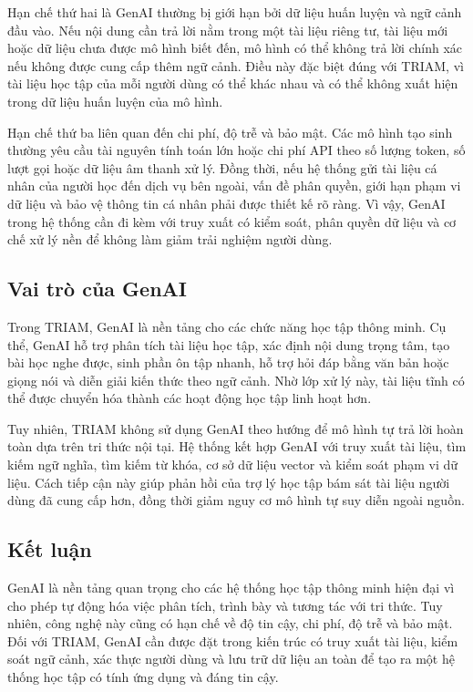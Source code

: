 \documentclass[12pt,a4paper]{report}
\begin{document}
Hạn chế thứ hai là GenAI thường bị giới hạn bởi dữ liệu huấn luyện và ngữ cảnh đầu vào. Nếu nội dung cần trả lời nằm trong một tài liệu riêng tư, tài liệu mới hoặc dữ liệu chưa được mô hình biết đến, mô hình có thể không trả lời chính xác nếu không được cung cấp thêm ngữ cảnh. Điều này đặc biệt đúng với TRIAM, vì tài liệu học tập của mỗi người dùng có thể khác nhau và có thể không xuất hiện trong dữ liệu huấn luyện của mô hình.

Hạn chế thứ ba liên quan đến chi phí, độ trễ và bảo mật. Các mô hình tạo sinh thường yêu cầu tài nguyên tính toán lớn hoặc chi phí API theo số lượng token, số lượt gọi hoặc dữ liệu âm thanh xử lý. Đồng thời, nếu hệ thống gửi tài liệu cá nhân của người học đến dịch vụ bên ngoài, vấn đề phân quyền, giới hạn phạm vi dữ liệu và bảo vệ thông tin cá nhân phải được thiết kế rõ ràng. Vì vậy, GenAI trong hệ thống cần đi kèm với truy xuất có kiểm soát, phân quyền dữ liệu và cơ chế xử lý nền để không làm giảm trải nghiệm người dùng.

\subsection{Vai trò của GenAI}

Trong TRIAM, GenAI là nền tảng cho các chức năng học tập thông minh. Cụ thể, GenAI hỗ trợ phân tích tài liệu học tập, xác định nội dung trọng tâm, tạo bài học nghe được, sinh phần ôn tập nhanh, hỗ trợ hỏi đáp bằng văn bản hoặc giọng nói và diễn giải kiến thức theo ngữ cảnh. Nhờ lớp xử lý này, tài liệu tĩnh có thể được chuyển hóa thành các hoạt động học tập linh hoạt hơn.

Tuy nhiên, TRIAM không sử dụng GenAI theo hướng để mô hình tự trả lời hoàn toàn dựa trên tri thức nội tại. Hệ thống kết hợp GenAI với truy xuất tài liệu, tìm kiếm ngữ nghĩa, tìm kiếm từ khóa, cơ sở dữ liệu vector và kiểm soát phạm vi dữ liệu. Cách tiếp cận này giúp phản hồi của trợ lý học tập bám sát tài liệu người dùng đã cung cấp hơn, đồng thời giảm nguy cơ mô hình tự suy diễn ngoài nguồn.

\subsection{Kết luận}

GenAI là nền tảng quan trọng cho các hệ thống học tập thông minh hiện đại vì cho phép tự động hóa việc phân tích, trình bày và tương tác với tri thức. Tuy nhiên, công nghệ này cũng có hạn chế về độ tin cậy, chi phí, độ trễ và bảo mật. Đối với TRIAM, GenAI cần được đặt trong kiến trúc có truy xuất tài liệu, kiểm soát ngữ cảnh, xác thực người dùng và lưu trữ dữ liệu an toàn để tạo ra một hệ thống học tập có tính ứng dụng và đáng tin cậy.
\end{document}
